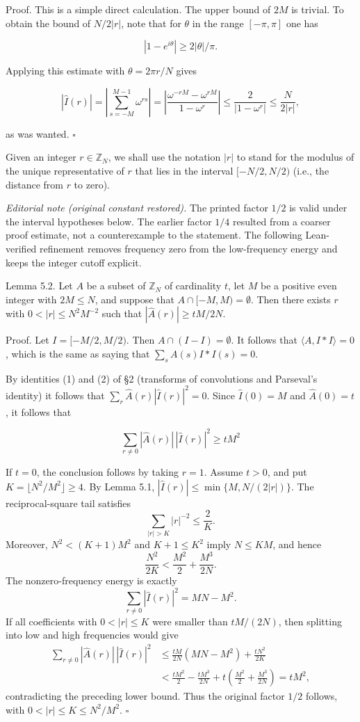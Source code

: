 \documentclass[10pt]{article}
\begin{document}
Proof. This is a simple direct calculation. The upper bound of $2 M$ is trivial. To obtain the bound of $N / 2|r|$, note that for $\theta$ in the range $[-\pi, \pi]$ one has

$$
\left|1-e^{i \theta}\right| \geqslant 2|\theta| / \pi .
$$

Applying this estimate with $\theta=2 \pi r / N$ gives

$$
|\hat{I}(r)|=\left|\sum_{s=-M}^{M-1} \omega^{r s}\right|=\left|\frac{\omega^{-r M}-\omega^{r M}}{1-\omega^{r}}\right| \leqslant \frac{2}{\left|1-\omega^{r}\right|} \leqslant \frac{N}{2|r|},
$$

as was wanted. \(\square\)

Given an integer $r \in \mathbb{Z}_{N}$, we shall use the notation $|r|$ to stand for the modulus of the unique representative of $r$ that lies in the interval $[-N / 2, N / 2)$ (i.e., the distance from $r$ to zero).

\textit{Editorial note (original constant restored).}
The printed factor $1/2$ is valid under the interval hypotheses below. The earlier factor $1/4$ resulted from a coarser proof estimate, not a counterexample to the statement. The following Lean-verified refinement removes frequency zero from the low-frequency energy and keeps the integer cutoff explicit.

Lemma 5.2. Let $A$ be a subset of $\mathbb{Z}_{N}$ of cardinality $t$, let $M$ be a positive even integer with $2M\leqslant N$, and suppose that $A \cap[-M, M)=\emptyset$. Then there exists $r$ with $0<|r| \leqslant N^{2} M^{-2}$ such that $|\hat{A}(r)| \geqslant t M / 2 N$.

Proof. Let $I=[-M / 2, M / 2)$. Then $A \cap(I-I)=\emptyset$. It follows that $\langle A, I * I\rangle=0$, which is the same as saying that $\sum_{s} A(s) I * I(s)=0$.

By identities (1) and (2) of §2 (transforms of convolutions and Parseval's identity) it follows that $\sum_{r} \hat{A}(r)|\hat{I}(r)|^{2}=0$. Since $\hat{I}(0)=M$ and $\hat{A}(0)=t$, it follows that

$$
\sum_{r \neq 0}|\hat{A}(r)|\,|\hat{I}(r)|^{2} \geqslant t M^{2}
$$

If $t=0$, the conclusion follows by taking $r=1$. Assume $t>0$, and put $K=\lfloor N^2/M^2\rfloor\geqslant4$. By Lemma 5.1,
$|\hat I(r)|\leqslant\min\{M,N/(2|r|)\}$. The reciprocal-square tail satisfies
\[
\sum_{|r|>K}|r|^{-2}\leqslant\frac2K.
\]
Moreover, $N^2<(K+1)M^2$ and $K+1\leqslant K^2$ imply $N\leqslant KM$, and hence
\[
\frac{N^2}{2K}<\frac{M^2}{2}+\frac{M^3}{2N}.
\]
The nonzero-frequency energy is exactly
\[
\sum_{r\ne0}|\hat I(r)|^2=MN-M^2.
\]
If all coefficients with $0<|r|\leqslant K$ were smaller than $tM/(2N)$, then splitting into low and high frequencies would give
\[
\begin{aligned}
\sum_{r\ne0}|\hat A(r)|\,|\hat I(r)|^2
&\leqslant \frac{tM}{2N}(MN-M^2)+\frac{tN^2}{2K}\\
&<\frac{tM^2}{2}-\frac{tM^3}{2N}
  +t\left(\frac{M^2}{2}+\frac{M^3}{2N}\right)
=tM^2,
\end{aligned}
\]
contradicting the preceding lower bound. Thus the original factor $1/2$ follows, with $0<|r|\leqslant K\leqslant N^2/M^2$. \(\square\)
\end{document}
